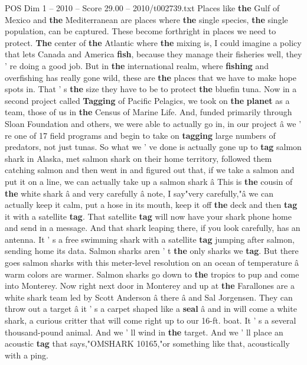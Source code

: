 \begin{textsample}{POS Dim 1 – 2010 – Score 29.00 – 2010/t002739.txt}
Places like \textbf{the} Gulf of Mexico and \textbf{the} Mediterranean are places where \textbf{the} single species, \textbf{the} single population, can be captured.
These become forthright in places we need to protect. \textbf{The} center of \textbf{the} Atlantic where \textbf{the} mixing is, I could imagine a policy that lets Canada and America \textbf{fish}, because they manage their fisheries well, they ' re doing a good job.
But in \textbf{the} international realm, where \textbf{fishing} and overfishing has really gone wild, these are \textbf{the} places that we have to make hope spots in.
That ' s \textbf{the} size they have to be to protect \textbf{the} bluefin tuna.
Now in a second project called \textbf{Tagging} of Pacific Pelagics, we took on \textbf{the} \textbf{planet} as a team, those of us in \textbf{the} Census of Marine Life.
And, funded primarily through Sloan Foundation and others, we were able to actually go in, in our project â we ' re one of 17 field programs and begin to take on \textbf{tagging} large numbers of predators, not just tunas.
So what we ' ve done is actually gone up to \textbf{tag} salmon shark in Alaska, met salmon shark on their home territory, followed them catching salmon and then went in and figured out that, if we take a salmon and put it on a line, we can actually take up a salmon shark â This is \textbf{the} cousin of \textbf{the} white shark â and very carefully â note, I say"very carefully,"â we can actually keep it calm, put a hose in its mouth, keep it off \textbf{the} deck and then \textbf{tag} it with a satellite \textbf{tag}.
That satellite \textbf{tag} will now have your shark phone home and send in a message.
And that shark leaping there, if you look carefully, has an antenna.
It ' s a free swimming shark with a satellite \textbf{tag} jumping after salmon, sending home its data.
Salmon sharks aren ' t \textbf{the} only sharks we \textbf{tag}.
But there goes salmon sharks with this meter-level resolution on an ocean of temperature â warm colors are warmer.
Salmon sharks go down to \textbf{the} tropics to pup and come into Monterey.
Now right next door in Monterey and up at \textbf{the} Farallones are a white shark team led by Scott Anderson â there â and Sal Jorgensen.
They can throw out a target â it ' s a carpet shaped like a \textbf{seal} â and in will come a white shark, a curious critter that will come right up to our 16-ft. boat.
It ' s a several thousand-pound animal.
And we ' ll wind in \textbf{the} target.
And we ' ll place an acoustic \textbf{tag} that says,"OMSHARK 10165,"or something like that, acoustically with a ping.

\end{textsample}
